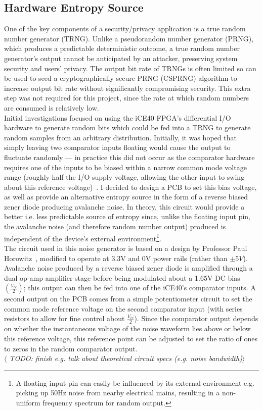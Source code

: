 \documentclass[12pt]{article}
\begin{document}
  \subsection{Hardware Entropy Source}
    One of the key components of a security/privacy application is a true random number generator (TRNG). Unlike a pseudorandom number generator (PRNG), which produces a predictable deterministic outcome, a true random number generator's output cannot be anticipated by an attacker, preserving system security and users' privacy. The output bit rate of TRNGs is often limited so can be used to seed a cryptographically secure PRNG (CSPRNG) algorithm to increase output bit rate without significantly compromising security. This extra step was not required for this project, since the rate at which random numbers are consumed is relatively low.\\

    Initial investigations focused on using the iCE40 FPGA's differential I/O hardware to generate random bits which could be fed into a TRNG to generate random samples from an arbitrary distribution. Initially, it was hoped that simply leaving two comparator inputs floating would cause the output to fluctuate randomly --- in practice this did not occur as the comparator hardware requires one of the inputs to be biased within a narrow common mode voltage range (roughly half the I/O supply voltage, allowing the other input to swing about this reference voltage)~\cite{ice40_diff_io}. I decided to design a PCB to set this bias voltage, as well as provide an alternative entropy source in the form of a reverse biased zener diode producing avalanche noise. In theory, this circuit would provide a better i.e. less predictable source of entropy since, unlike the floating input pin, the avalanche noise (and therefore random number output) produced is independent of the device's external environment\footnote{A floating input pin can easily be influenced by its external environment e.g. picking up 50Hz noise from nearby electrical mains, resulting in a non-uniform frequency spectrum for random output.}.\\

    The circuit used in this noise generator is based on a design by Professor Paul Horowitz~\cite[p.~984]{art_of_electronics}, modified to operate at 3.3V and 0V power rails (rather than $\pm5V$). Avalanche noise produced by a reverse biased zener diode is amplified through a dual op-amp amplifier stage before being modulated about a 1.65V DC bias $\left(\frac{V_{cc}}{2}\right)$; this output can then be fed into one of the iCE40's comparator inputs. A second output on the PCB comes from a simple potentiometer circuit to set the common mode reference voltage on the second comparator input (with series resistors to allow for fine control about $\frac{V_{cc}}{2}$). Since the comparator output depends on whether the instantaneous voltage of the noise waveform lies above or below this reference voltage, this reference point can be adjusted to set the ratio of ones to zeros in the random comparator output.\\
    \textit{$\langle$ TODO: finish e.g. talk about theoretical circuit specs (e.g. noise bandwidth)$\rangle$}
\end{document}
